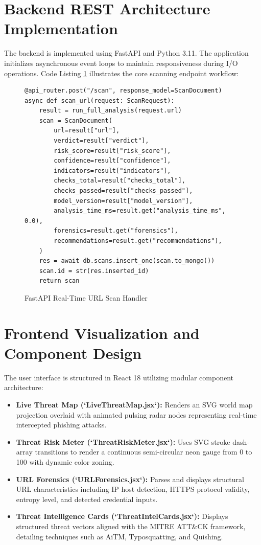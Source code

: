 \documentclass[BTech]{srmuthesis}
\begin{document}
\section{Backend REST Architecture Implementation}
The backend is implemented using FastAPI and Python 3.11. The application initializes asynchronous event loops to maintain responsiveness during I/O operations. Code Listing \ref{code:fastapi_scan} illustrates the core scanning endpoint workflow:

\begin{figure}[htpb]
\centering
\begin{minipage}{0.95\textwidth}
\begin{singlespace}
\small
\begin{verbatim}
@api_router.post("/scan", response_model=ScanDocument)
async def scan_url(request: ScanRequest):
    result = run_full_analysis(request.url)
    scan = ScanDocument(
        url=result["url"],
        verdict=result["verdict"],
        risk_score=result["risk_score"],
        confidence=result["confidence"],
        indicators=result["indicators"],
        checks_total=result["checks_total"],
        checks_passed=result["checks_passed"],
        model_version=result["model_version"],
        analysis_time_ms=result.get("analysis_time_ms", 0.0),
        forensics=result.get("forensics"),
        recommendations=result.get("recommendations"),
    )
    res = await db.scans.insert_one(scan.to_mongo())
    scan.id = str(res.inserted_id)
    return scan
\end{verbatim}
\end{singlespace}
\end{minipage}
\caption{FastAPI Real-Time URL Scan Handler}
\label{code:fastapi_scan}
\end{figure}

\section{Frontend Visualization and Component Design}
The user interface is structured in React 18 utilizing modular component architecture:
\begin{itemize}
    \item \textbf{Live Threat Map (`LiveThreatMap.jsx`):} Renders an SVG world map projection overlaid with animated pulsing radar nodes representing real-time intercepted phishing attacks.
    \item \textbf{Threat Risk Meter (`ThreatRiskMeter.jsx`):} Uses SVG stroke dash-array transitions to render a continuous semi-circular neon gauge from 0 to 100 with dynamic color zoning.
    \item \textbf{URL Forensics (`URLForensics.jsx`):} Parses and displays structural URL characteristics including IP host detection, HTTPS protocol validity, entropy level, and detected credential inputs.
    \item \textbf{Threat Intelligence Cards (`ThreatIntelCards.jsx`):} Displays structured threat vectors aligned with the MITRE ATT\&CK framework, detailing techniques such as AiTM, Typosquatting, and Quishing.
\end{itemize}
\end{document}
